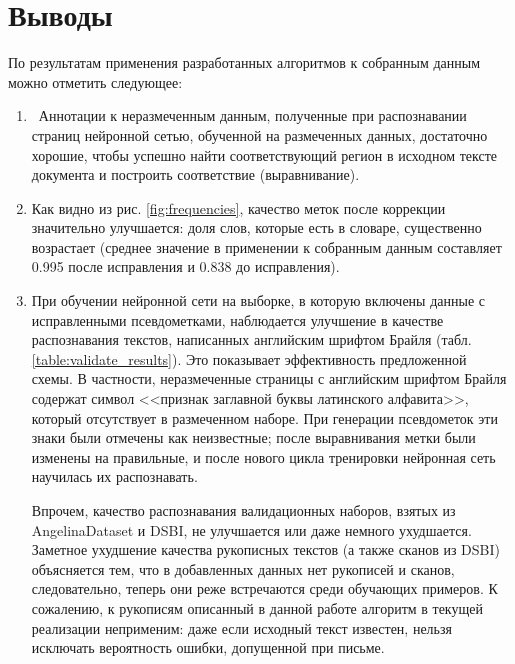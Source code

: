 \documentclass{main.tex}[subfiles]
\begin{document}
\newpage
\section{Выводы}

По результатам применения разработанных алгоритмов к собранным данным можно отметить следующее:
\begin{enumerate}[noitemsep]
	\item  Аннотации к неразмеченным данным, полученные при распознавании страниц нейронной сетью, обученной на размеченных данных, достаточно хорошие, чтобы успешно найти соответствующий регион в исходном тексте документа и построить соответствие (выравнивание).
	\item Как видно из рис. \ref{fig:frequencies}, качество меток после коррекции значительно улучшается: доля слов, которые есть в словаре, существенно возрастает (среднее значение в применении к собранным данным составляет 0.995 после исправления и 0.838 до исправления).
	\item При обучении нейронной сети на выборке, в которую включены данные с исправленными псевдометками, наблюдается улучшение в качестве распознавания текстов, написанных английским шрифтом Брайля (табл. \ref{table:validate_results}).
	Это показывает эффективность предложенной схемы.
	В частности, неразмеченные страницы с английским шрифтом Брайля содержат символ <<признак заглавной буквы латинского алфавита>>, который отсутствует в размеченном наборе.
	При генерации псевдометок эти знаки были отмечены как неизвестные; после выравнивания метки были изменены на правильные, и после нового цикла тренировки нейронная сеть научилась их распознавать.

	Впрочем, качество распознавания валидационных наборов, взятых из AngelinaDataset и DSBI, не улучшается или даже немного ухудшается.
	Заметное ухудшение качества рукописных текстов (а также сканов из DSBI) объясняется тем, что в добавленных данных нет рукописей и сканов, следовательно, теперь они реже встречаются среди обучающих примеров.
	К сожалению, к рукописям описанный в данной работе алгоритм в текущей реализации неприменим: даже если исходный текст известен, нельзя исключать вероятность ошибки, допущенной при письме.
\end{enumerate}
\end{document}
